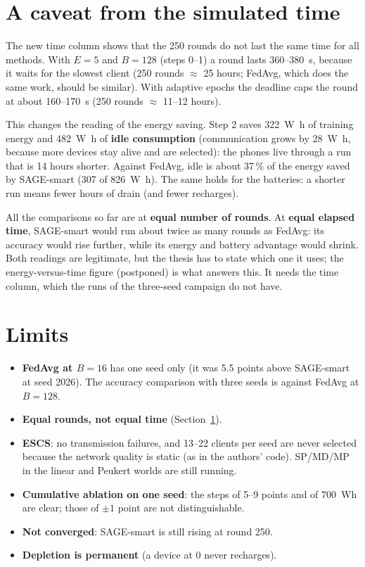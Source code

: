 \documentclass[11pt,a4paper]{article}
\begin{document}
\section{A caveat from the simulated time}
\label{sec:time}

The new time column shows that the 250 rounds do not last the same time for all
methods. With $E=5$ and $B=128$ (steps 0--1) a round lasts 360--380~s, because
it waits for the slowest client (250 rounds $\approx$ 25 hours; FedAvg, which
does the same work, should be similar). With adaptive epochs the deadline caps
the round at about 160--170~s (250 rounds $\approx$ 11--12 hours).

This changes the reading of the energy saving. Step 2 saves
\SI{322}{\watt\hour} of training energy and \SI{482}{\watt\hour} of
\textbf{idle consumption} (communication grows by \SI{28}{\watt\hour}, because
more devices stay alive and are selected): the phones live through a run that
is 14 hours shorter. Against FedAvg, idle is about 37\,\% of the energy saved by SAGE-smart
(\SI{307}{} of \SI{826}{\watt\hour}). The same holds for the batteries: a
shorter run means fewer hours of drain (and fewer recharges).

All the comparisons so far are at \textbf{equal number of rounds}. At
\textbf{equal elapsed time}, SAGE-smart would run about twice as many rounds as
FedAvg: its accuracy would rise further, while its energy and battery advantage
would shrink. Both readings are legitimate, but the thesis has to state which
one it uses; the energy-versus-time figure (postponed) is what answers this.
It needs the time column, which the runs of the three-seed campaign do not
have.

\section{Limits}

\begin{itemize}
  \item \textbf{FedAvg at $B=16$} has one seed only (it was 5.5 points above
        SAGE-smart at seed 2026). The accuracy comparison with three seeds is
        against FedAvg at $B=128$.
  \item \textbf{Equal rounds, not equal time} (Section~\ref{sec:time}).
  \item \textbf{ESCS}: no transmission failures, and 13--22 clients per seed are
        never selected because the network quality is static (as in the
        authors' code). SP/MD/MP in the linear and Peukert worlds are still
        running.
  \item \textbf{Cumulative ablation on one seed}: the steps of 5--9 points and
        of 700~Wh are clear; those of $\pm1$ point are not distinguishable.
  \item \textbf{Not converged}: SAGE-smart is still rising at round 250.
  \item \textbf{Depletion is permanent} (a device at 0 never recharges).
\end{itemize}
\end{document}
